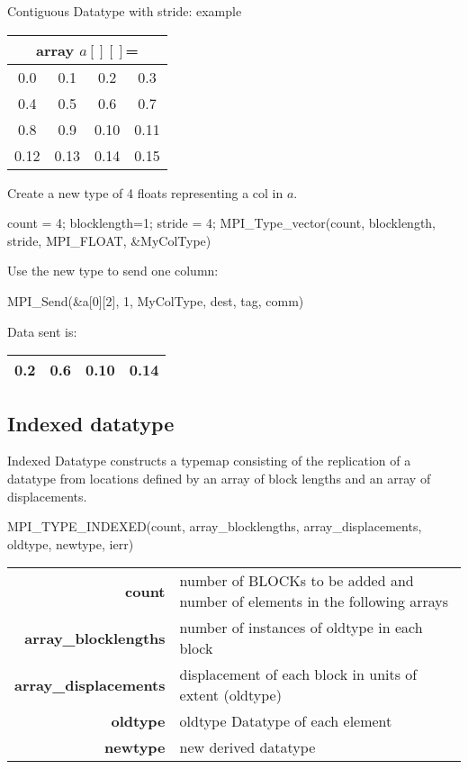 \documentclass[aspectratio=43]{beamer}
\begin{document}
\begin{frame}[fragile]{Contiguous Datatype with stride: example}
\begin{center}
\begin{tabular}{|c|c|c|c|}
    \multicolumn{4}{c}{array $a[][]$=}\\\hline
0.0  & 0.1  & 0.2  & 0.3\\\hline
0.4  & 0.5  & 0.6  & 0.7\\\hline
0.8  & 0.9  & 0.10 & 0.11\\\hline
0.12 & 0.13 & 0.14 & 0.15\\\hline
\end{tabular}
\end{center}
Create a new type of 4 floats representing a col in $a$.\\
\begin{Cpplisting}[]{}
count = 4; blocklength=1; stride = 4;
MPI_Type_vector(count, blocklength, stride, MPI_FLOAT, &MyColType)
\end{Cpplisting}
Use the new type to send one column:\\
\begin{Cpplisting}[]{}
MPI_Send(&a[0][2], 1, MyColType, dest, tag, comm)
\end{Cpplisting}
Data sent is:
\begin{tabular}{|c|c|c|c|}
\hline
\color{cscsblue}0.2  & \color{cscsblue}0.6  & \color{cscsblue}0.10 & \color{cscsblue}0.14\\
\hline
\end{tabular}

\end{frame}

\subsection{Indexed datatype}
\begin{frame}[fragile]{Indexed Datatype}
 constructs a typemap consisting of the replication of a datatype from locations defined by an array of block lengths and an array of displacements.
\begin{Cpplisting}[]{}
MPI_TYPE_INDEXED(count, array_blocklengths, array_displacements, oldtype, newtype, ierr)
\end{Cpplisting}
\begin{black1block}{}
\begin{tabular}{rp{6.4cm}}
\textbf{count} & number of BLOCKs to be added and number of elements in the following arrays\\
\textbf{array\_blocklengths} & number of instances of oldtype in each block\\
\textbf{array\_displacements} & displacement of each block in units of extent (oldtype)\\
\textbf{oldtype} & oldtype Datatype of each element\\
\textbf{newtype} & new derived datatype\\
\end{tabular}
\end{black1block}
\end{frame}
\end{document}
